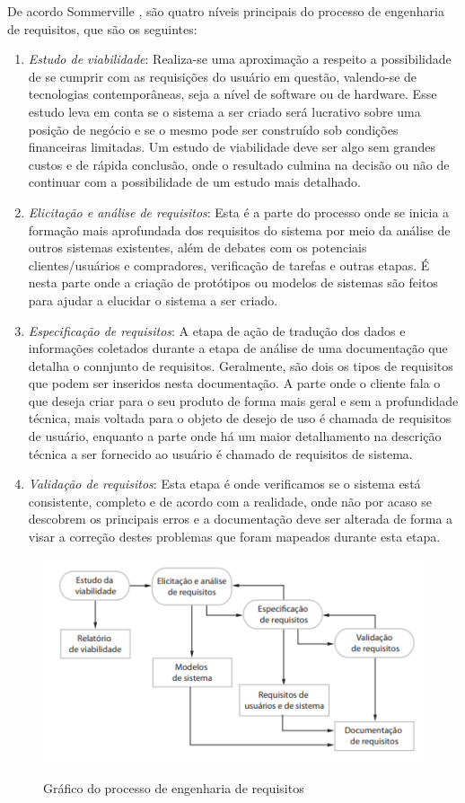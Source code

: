 De acordo Sommerville \cite{Sommerville07}, são quatro níveis principais do processo de engenharia de requisitos, que são os seguintes:
\begin{enumerate}
    \item \textit{Estudo de viabilidade}: Realiza-se uma aproximação a respeito a possibilidade de se cumprir com as requisições do usuário em questão, valendo-se de tecnologias contemporâneas, seja a nível de software ou de hardware. Esse estudo leva em conta se o sistema a ser criado será lucrativo sobre uma posição de negócio e se o mesmo pode ser construído sob condições financeiras limitadas. Um estudo de viabilidade deve ser algo sem grandes custos e de rápida conclusão, onde o resultado culmina na decisão ou não de continuar com a possibilidade de um estudo mais detalhado.
    \item \textit{Elicitação e análise de requisitos}: Esta é a parte do processo onde se inicia a formação mais aprofundada dos requisitos do sistema por meio da análise de outros sistemas existentes, além de debates com os potenciais clientes/usuários e compradores, verificação de tarefas e outras etapas. É nesta parte onde a criação de protótipos ou modelos de sistemas são feitos para ajudar a elucidar o sistema a ser criado.
    \item \textit{Especificação de requisitos}: A etapa de ação de tradução dos dados e informações coletados durante a etapa de análise de uma documentação que detalha o connjunto de requisitos. Geralmente, são dois os tipos de requisitos que podem ser inseridos nesta documentação. A parte onde o cliente fala o que deseja criar para o seu produto de forma mais geral e sem a profundidade técnica, mais voltada para o objeto de desejo de uso é chamada de requisitos de usuário, enquanto a parte onde há um maior detalhamento na descrição técnica a ser fornecido ao usuário é chamado de requisitos de sistema.
    \item \textit{Validação de requisitos}: Esta etapa é onde verificamos se o sistema está consistente, completo e de acordo com a realidade, onde não por acaso se descobrem os principais erros e a documentação deve ser alterada de forma a visar a correção destes problemas que foram mapeados durante esta etapa.
\end{enumerate}

\begin{figure}
    \centering
    \includegraphics{img/eng_req.png}
    \caption{Gráfico do processo de engenharia de requisitos} \cite{Sommerville07}
    \label{fig:eng_req}
\end{figure}


